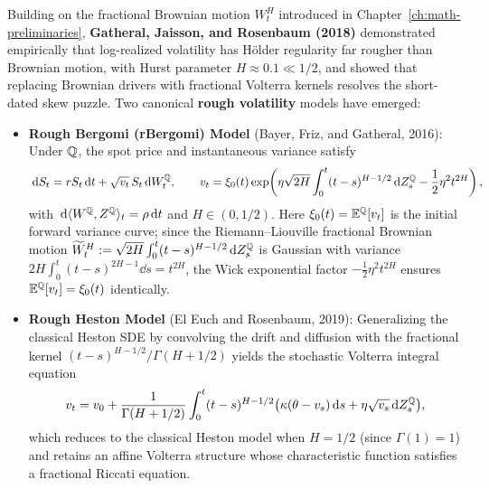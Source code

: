 Building on the fractional Brownian motion $W_t^H$ introduced in Chapter~\ref{ch:math-preliminaries}, \textbf{Gatheral, Jaisson, and Rosenbaum (2018)} demonstrated empirically that log-realized volatility has H\"older regularity far rougher than Brownian motion, with Hurst parameter $H \approx 0.1 \ll 1/2$, and showed that replacing Brownian drivers with fractional Volterra kernels resolves the short-dated skew puzzle. Two canonical \textbf{rough volatility} models have emerged:
\begin{itemize}
    \item \textbf{Rough Bergomi (rBergomi) Model} (Bayer, Friz, and Gatheral, 2016): Under $\mathbb{Q}$, the spot price and instantaneous variance satisfy
    \begin{equation}
        \label{eq:ch05-rbergomi}
        \,\mathrm{d} S_t = r S_t \,\mathrm{d} t + \sqrt{v_t}\,S_t \,\mathrm{d} W_t^{\mathbb{Q}}, \qquad
        v_t = \xi_0(t)\exp\!\left(\eta\sqrt{2H}\int_0^t (t - s)^{H - 1/2}\,\mathrm{d} Z_s^{\mathbb{Q}} - \frac{1}{2}\eta^2 t^{2H}\right),
    \end{equation}
    with $\,\mathrm{d}\langle W^{\mathbb{Q}}, Z^{\mathbb{Q}}\rangle_t = \rho \,\mathrm{d} t$ and $H \in (0, 1/2)$. Here $\xi_0(t) = \mathbb{E}^{\mathbb{Q}}[v_t]$ is the initial forward variance curve; since the Riemann--Liouville fractional Brownian motion $\widetilde{W}_t^H := \sqrt{2H}\int_0^t (t - s)^{H - 1/2}\,\mathrm{d} Z_s^{\mathbb{Q}}$ is Gaussian with variance $2H \int_0^t (t - s)^{2H - 1}\dd s = t^{2H}$, the Wick exponential factor $-\frac{1}{2}\eta^2 t^{2H}$ ensures $\mathbb{E}^{\mathbb{Q}}[v_t] = \xi_0(t)$ identically.
    \item \textbf{Rough Heston Model} (El Euch and Rosenbaum, 2019): Generalizing the classical Heston SDE by convolving the drift and diffusion with the fractional kernel $(t - s)^{H - 1/2}/\Gamma(H + 1/2)$ yields the stochastic Volterra integral equation
    \begin{equation}
        \label{eq:ch05-rough-heston}
        v_t = v_0 + \frac{1}{\Gamma(H + 1/2)}\int_0^t (t - s)^{H - 1/2}\bigl(\kappa(\theta - v_s)\,\mathrm{d} s + \eta\sqrt{v_s}\,\mathrm{d} Z_s^{\mathbb{Q}}\bigr),
    \end{equation}
    which reduces to the classical Heston model when $H = 1/2$ (since $\Gamma(1) = 1$) and retains an affine Volterra structure whose characteristic function satisfies a fractional Riccati equation.
\end{itemize}

